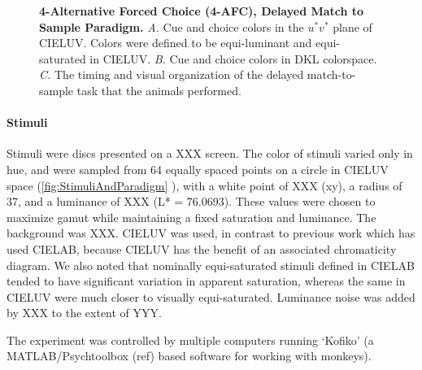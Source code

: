 \begin{figure}

\caption{\textbf{4-Alternative Forced Choice (4-AFC), Delayed Match to Sample Paradigm.}
\emph{A.} Cue and choice colors in the $u^*v^*$ plane of CIELUV. Colors were defined to be equi-luminant and equi-saturated in CIELUV.
\emph{B.} Cue and choice colors in DKL colorspace.
\emph{C.} The timing and visual organization of the delayed match-to-sample task that the animals performed.
} 
\label{fig:StimuliAndParadigm}
\end{figure}

\paragraph{Stimuli} 

Stimuli were discs presented on a XXX screen.
The color of stimuli varied only in hue, and were sampled from 64 equally spaced points on a circle in CIELUV space (\autoref{fig:StimuliAndParadigm}%
), with a white point of XXX (xy), a radius of 37, and a luminance of XXX (L* = 76.0693). 
These values were chosen to maximize gamut while maintaining a fixed saturation and luminance. 
The background was XXX.
CIELUV was used, in contrast to previous work which has used CIELAB, because CIELUV has the benefit of an associated chromaticity diagram. 
We also noted that nominally equi-saturated stimuli defined in CIELAB tended to have significant variation in apparent saturation, whereas the same in CIELUV were much closer to visually equi-saturated. 
Luminance noise was added by XXX to the extent of YYY.

The experiment was controlled by multiple computers running `Kofiko' (a MATLAB/Psychtoolbox (ref) based software for working with monkeys).

